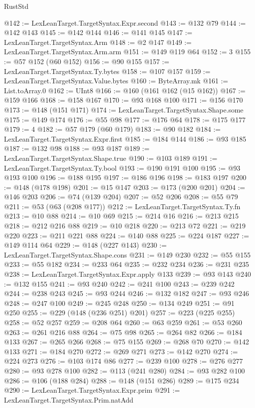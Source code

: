 \begin{lexlean}{RustStd}
\begin{coremodule}
@142 := LexLeanTarget.TargetSyntax.Expr.second
@143 := @132 @79
@144 := @142 @143
@145 := @142 @144
@146 := @141 @145
@147 := LexLeanTarget.TargetSyntax.Arm
@148 := @2 @147
@149 := LexLeanTarget.TargetSyntax.Arm.arm
@151 := @149 @119 @64
@152 := 3
@155 := @57 @152 (@60 @152)
@156 := @90 @155
@157 := LexLeanTarget.TargetSyntax.Ty.bytes
@158 := @107 @157
@159 := LexLeanTarget.TargetSyntax.Value.bytes
@160 := ByteArray.mk
@161 := List.toArray.{0}
@162 := UInt8
@166 := @160 (@161 @162 (@15 @162))
@167 := @159 @166
@168 := @158 @167
@170 := @93 @168 @100
@171 := @156 @170
@173 := @148 (@151 @171)
@174 := LexLeanTarget.TargetSyntax.Shape.some
@175 := @149 @174
@176 := @55 @98
@177 := @176 @64
@178 := @175 @177
@179 := 4
@182 := @57 @179 (@60 @179)
@183 := @90 @182
@184 := LexLeanTarget.TargetSyntax.Expr.first
@185 := @184 @144
@186 := @93 @185
@187 := @132 @98
@188 := @93 @187
@189 := LexLeanTarget.TargetSyntax.Shape.true
@190 := @103 @189
@191 := LexLeanTarget.TargetSyntax.Ty.bool
@193 := @190 @191 @100
@195 := @93 @193 @100
@196 := @188 @195
@197 := @186 @196
@198 := @183 @197
@200 := @148 (@178 @198)
@201 := @15 @147
@203 := @173 (@200 @201)
@204 := @146 @203
@206 := @74 (@139 @204)
@207 := @52 @206
@208 := @55 @79
@211 := @53 (@63 (@208 @177))
@212 := LexLeanTarget.TargetSyntax.Ty.fn
@213 := @10 @88
@214 := @10 @69
@215 := @214 @16
@216 := @213 @215
@218 := @212 @216 @88
@219 := @10 @218
@220 := @213 @72
@221 := @219 @220
@223 := @211 @221 @88
@224 := @140 @88
@225 := @224 @187
@227 := @149 @114 @64
@229 := @148 (@227 @143)
@230 := LexLeanTarget.TargetSyntax.Shape.cons
@231 := @149 @230
@232 := @55 @155
@233 := @55 @182
@234 := @233 @64
@235 := @232 @234
@236 := @231 @235
@238 := LexLeanTarget.TargetSyntax.Expr.apply @133
@239 := @93 @143
@240 := @132 @155
@241 := @93 @240
@242 := @241 @100
@243 := @239 @242
@244 := @238 @243
@245 := @93 @244
@246 := @132 @182
@247 := @93 @246
@248 := @247 @100
@249 := @245 @248
@250 := @134 @249
@251 := @91 @250
@255 := @229 (@148 (@236 @251) @201)
@257 := @223 (@225 @255)
@258 := @52 @257
@259 := @208 @64
@260 := @63 @259
@261 := @53 @260
@263 := @261 @216 @88
@264 := @75 @98
@265 := @264 @82
@266 := @184 @133
@267 := @265 @266
@268 := @75 @155
@269 := @268 @70
@270 := @142 @133
@271 := @184 @270
@272 := @269 @271
@273 := @142 @270
@274 := @224 @273
@276 := @103 @174 @86
@277 := @239 @100
@278 := @276 @277
@280 := @93 @278 @100
@282 := @113 (@241 @280)
@284 := @93 @282 @100
@286 := @106 (@188 @284)
@288 := @148 (@151 @286)
@289 := @175 @234
@290 := LexLeanTarget.TargetSyntax.Expr.prim
@291 := LexLeanTarget.TargetSyntax.Prim.natAdd

\end{coremodule}
\end{lexlean}
